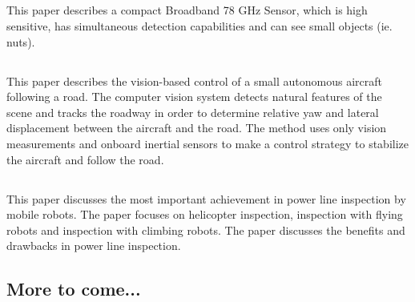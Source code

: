 \documentclass[11pt]{article}
\begin{document}
\subsection{\cite{Feil2008}}
This paper describes a compact Broadband 78 GHz Sensor, which is high sensitive, has simultaneous detection capabilities and can see small objects (ie. nuts).
\subsection{\cite{Frew2004}}
This paper describes the vision-based control of a small autonomous aircraft following a road. The computer vision system detects natural features of the scene and tracks the roadway in order to determine relative yaw and lateral displacement between the aircraft and the road. The method uses only vision measurements and onboard inertial sensors to make a control strategy to stabilize the aircraft and follow the road.
\subsection{\cite{Katrasnik2010}}
This paper discusses the most important achievement in power line inspection by mobile robots. The paper focuses on helicopter inspection, inspection with flying robots and inspection with climbing robots. The paper discusses the benefits and drawbacks in power line inspection.
\subsection{More to come...}


\end{document}
